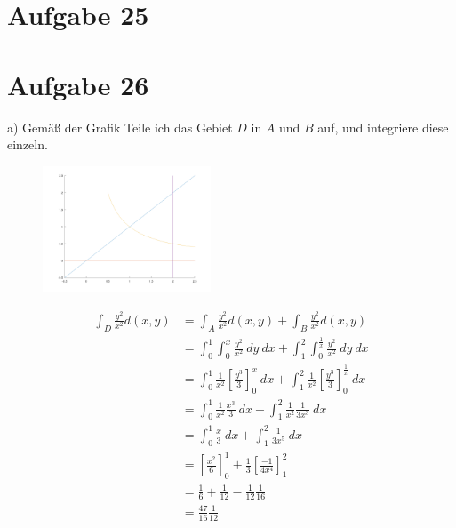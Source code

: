 \documentclass[10pt]{article}
\begin{document}
\thispagestyle{fancy}
\section*{Aufgabe 25}


\section*{Aufgabe 26}
a) Gemäß der Grafik Teile ich das Gebiet $D$ in $A$ und $B$ auf, und 
integriere diese einzeln.
\begin{figure}
	\centering
	\includegraphics[width=5cm]{26-plt.png}
\end{figure}

\begin{align*}
	\int_D \frac{y^2}{x^2} d(x,y) 
	&= \int_A \frac{y^2}{x^2} d(x,y) +\int_B \frac{y^2}{x^2} d(x,y) \\
	&= \int_0^1 \int_0^x \frac{y^2}{x^2} \ dy \ dx
	+ \int_1^2 \int_0^{\frac1x} \frac{y^2}{x^2} \ dy \ dx \\
	&= \int_0^1 \frac1{x^2} \left[ \frac{y^3}{3} \right]_0^x \ dx
	+ \int_1^2 \frac1{x^2} 
	\left[ \frac{y^3}{3} \right]_0^{\frac1x} \ dx \\
	&= \int_0^1 \frac1{x^2}\frac{x^3}{3} \ dx
	+ \int_1^2 \frac1{x^2} 
	\frac{1}{3x^3} \ dx \\
	&= \int_0^1 \frac x3 \ dx
	+ \int_1^2 \frac{1}{3x^5} \ dx \\
	&= \left[ \frac{x^2}{6} \right]_0^1
	+ \frac13 \left[ \frac{-1}{4x^4} \right]_1^2 \\
	&= \frac16 + \frac 1{12} - \frac{1}{12} \frac1{16} \\
	&= \frac{47}{16} \frac{1}{12}
\end{align*}
\end{document}
